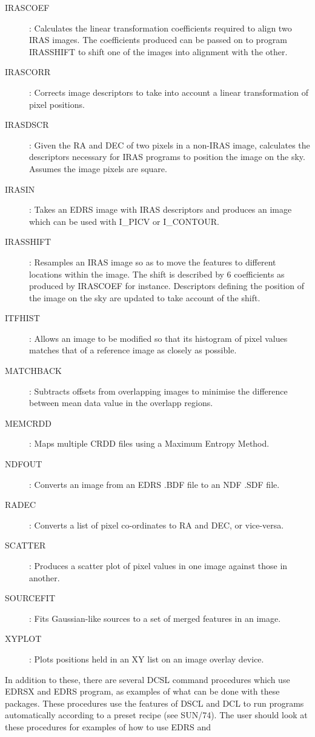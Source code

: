 \begin{description}
\item[IRASCOEF]: Calculates the linear transformation coefficients required to
align two IRAS images.
The coefficients produced can be passed on to program IRASSHIFT to shift one of
the images into alignment with the other.
\item[IRASCORR]: Corrects image descriptors to take into account a linear
transformation of pixel positions.
\item[IRASDSCR]: Given the RA and DEC of two pixels in a non-IRAS image,
calculates the descriptors necessary for IRAS programs to position the image on
the sky.
Assumes the image pixels are square.
\item[IRASIN]: Takes an EDRS image with IRAS descriptors and produces an image
which can be used with I\_PICV or I\_CONTOUR.
\item[IRASSHIFT]: Resamples an IRAS image so as to move the features to
different locations within the image.
The shift is described by 6 coefficients as produced by IRASCOEF for instance.
Descriptors defining the position of the image on the sky are updated to take
account of the shift.
\item[ITFHIST]: Allows an image to be modified so that its histogram of pixel
values matches that of a reference image as closely as possible.
\item[MATCHBACK]: Subtracts offsets from overlapping images to minimise
the difference between mean data value in the overlapp regions.
\item[MEMCRDD]: Maps multiple CRDD files using a Maximum Entropy Method.
\item[NDFOUT]: Converts an image from an EDRS .BDF file to an NDF .SDF file.
\item[RADEC]: Converts a list of pixel co-ordinates to RA and DEC, or
vice-versa.
\item[SCATTER]: Produces a scatter plot of pixel values in one image
against those in another.
\item[SOURCEFIT]: Fits Gaussian-like sources to a set of merged features in an
image.
\item[XYPLOT]: Plots positions held in an XY list on an image overlay device.
\end{description}
In addition to these, there are several DCSL command procedures which use EDRSX
and EDRS program, as examples of what can be done with these packages.
These procedures use the features of DSCL and DCL to run programs automatically
according to a preset recipe (see SUN/74).
The user should look at these procedures for examples of how to use EDRS and
